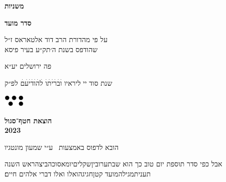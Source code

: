 \documentclass[14pt, a5paper, twoside, extrafontsizes]{memoir}
\begin{document}
\frontmatter
\pagestyle{myheadings}
\thispagestyle{mytitlepage}
\begin{hebrew}
{\Centering  

  {\huge\bfseries משניות}
  
  {\LARGE\bfseries סדר מועד}

  \vspace{1em}

  \vspace{0.5em}
  על פי מהדורת הרב דוד אלטאראס ז״ל\\שהודפס בשנת ה׳תק״ע בעיר פיסא

    \vspace{8em}
    פה {\LARGE ירושלים} יע״א

    {\small שנת}
     סוד יי ליראיו
    {\Large וׄבׄרׄיׄתׄוׄ לׄהׄוׄדׄיׄעׄםׄ}
    {\small לפ״ק}
    
    \vspace{2em}
  \includegraphics[width=10mm]{hatafSegolLogoNoText.png}\\
  
    \vspace{.5em}
  {
    \bfseries הוצאת חטף־סגול\\2023
    
 {\footnotesize  הובא לדפוס באמצעות \XeLaTeX\ ע״י שמעון מונטגיו}

  }
    
}


\vspace{1em}
{
\parskip 2pt


\vspace{4pt}
{ \small
 {\larger  אבל} כפי סדר תוספת יום טוב כך הוא\hdot
    שבת\hdot ערובין\hdot שקלים\hdot יומא\hdot סוכה\hdot ביצה\hdot ראש השנה\hdot
    תענית\hdot מגילה\hdot מועד קטן\hdot חגיגה\hdot ואלו ואלו דברי אלהים חיים׃}
}
\mainmatter
{}
\thispagestyle{empty}














\end{hebrew}
\end{document}
